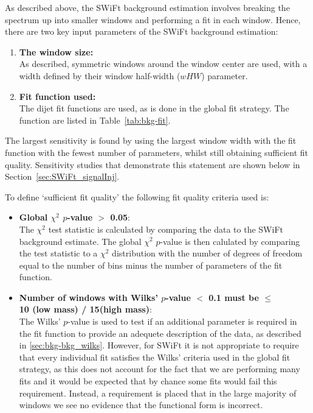 As described above, the SWiFt background estimation involves breaking the spectrum up into smaller windows and performing a fit in each window.
Hence, there are two key input parameters of the SWiFt background estimation:
\begin{enumerate}[leftmargin=*]
\item \textbf{The window size:}\\
  As described, symmetric windows around the window center are used, with a width defined by their window half-width ($wHW$) parameter.\vspace{0.5em}
\item \textbf{Fit function used:}\\
  The dijet fit functions are used, as is done in the global fit strategy. The function are listed in Table~\ref{tab:bkg-fit}.
\end{enumerate}
The largest sensitivity is found by using the largest window width with the fit function with the fewest number of parameters, whilst still obtaining sufficient fit quality.
Sensitivity studies that demonstrate this statement are shown below in Section~\ref{sec:SWiFt_signalInj}.

\noindent
To define `sufficient fit quality' the following fit quality criteria used is:
\begin{itemize}[leftmargin=*]
  
\item \textbf{Global $\chi^{2}$ \mbox{$p$-value} $>$ 0.05}:\\
  The $\chi^{2}$ test statistic is calculated by comparing the data to the SWiFt background estimate.
  The global $\chi^{2}$ \mbox{$p$-value} is then calulated by comparing the test statistic
  to a $\chi^{2}$ distribution with the number of degrees of freedom equal to the number of bins
  minus the number of parameters of the fit function.\vspace{0.5em}
\item \textbf{Number of windows with Wilks' \mbox{$p$-value} $<$ 0.1 must be $\leq$ \\10 (low mass) / 15(high mass)}:\\
  The Wilks' \mbox{$p$-value} is used to test if an additional parameter is required in the fit function
  to provide an adequete description of the data, as described in \ref{sec:bkg-bkg_wilks}. 
  However, for SWiFt it is not appropriate to require that every individual fit satisfies the Wilks' criteria used in the global fit strategy,
  as this does not account for the fact that we are performing many fits and it would be expected that by chance some fits would fail this requirement.
  Instead, a requirement is placed that in the large majority of windows we see no evidence that the functional form is incorrect.
\end{itemize}

